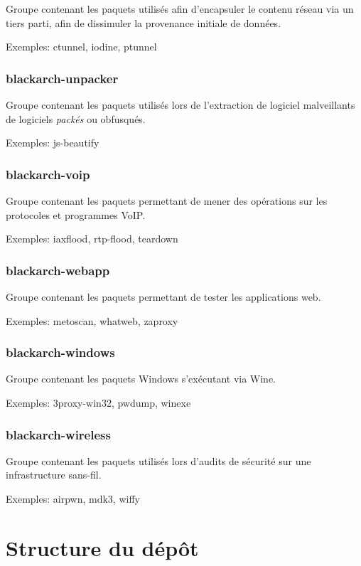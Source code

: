 \documentclass[a4paper, oneside, 11pt]{book}
\begin{document}
Groupe contenant les paquets utilis\'{e}s afin d'encapsuler le contenu r\'{e}seau via un
tiers parti, afin de dissimuler la provenance initiale de donn\'{e}es.

Exemples: ctunnel, iodine, ptunnel

\subsubsection{blackarch-unpacker}

Groupe contenant les paquets utilis\'{e}s lors de l'extraction de logiciel
malveillants de logiciels \textit{pack\'{e}s} ou obfusqu\'{e}s.

Exemples: js-beautify

\subsubsection{blackarch-voip}

Groupe contenant les paquets permettant de mener des op\'{e}rations sur les protocoles et programmes VoIP.

Exemples: iaxflood, rtp-flood, teardown

\subsubsection{blackarch-webapp}

Groupe contenant les paquets permettant de tester les applications web.

Exemples: metoscan, whatweb, zaproxy

\subsubsection{blackarch-windows}

Groupe contenant les paquets Windows s'ex\'{e}cutant via Wine.

Exemples: 3proxy-win32, pwdump, winexe

\subsubsection{blackarch-wireless}

Groupe contenant les paquets utilis\'{e}s lors d'audits de s\'{e}curit\'{e} sur une
infrastructure sans-fil.

Exemples: airpwn, mdk3, wiffy

\section{Structure du d\'{e}p\^{o}t}
\end{document}

